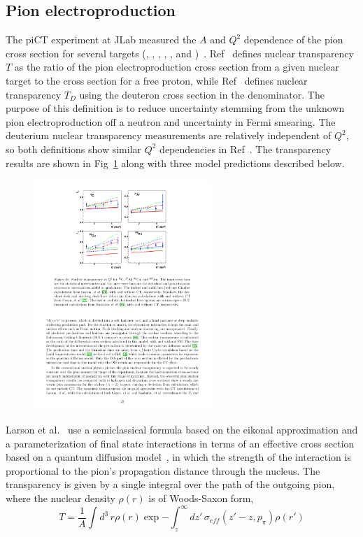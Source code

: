 \subsection{Pion electroproduction}
The piCT experiment at JLab measured the $A$ and $Q^2$ dependence of the pion
cross section for several targets (, , ,
, , and )~\cite{Clasie_2007, Qian_2010}.
Ref~\cite{Clasie_2007} defines nuclear transparency $T$ as the ratio of the pion
electroproduction cross section from a given nuclear target to the cross
section for a free proton, while Ref~\cite{Qian_2010} defines nuclear
transparency $T_D$ using the deuteron cross section in the denominator.
The purpose of this definition is to reduce uncertainty stemming from
the unknown pion electroproduction off a neutron and uncertainty in Fermi
smearing.
The deuterium nuclear transparency measurements are relatively independent of
$Q^2$, so both definitions show similar $Q^2$ dependencies in
Ref~\cite{Qian_2010}.
The transparency results are shown in
Fig~\ref{fig:pion_electroproduction_transparency_Q2_dependence} along with three
model predictions described below.

\begin{figure}[!h]
    \centering
    \includegraphics[width=0.6\textwidth]{chap2/pion_electroproduction_transparency_Q2_dependence.pdf}
    \caption{
            }
    \label{fig:pion_electroproduction_transparency_Q2_dependence}
\end{figure}

Larson et al.~\cite{Larson_2006} use a semiclassical formula based on the
eikonal approximation and a parameterization of final state interactions in
terms of an effective cross section based on a quantum diffusion
model~\cite{Farrar_1988}, in which the strength of the interaction is
proportional to the pion's propagation distance through the nucleus.
The transparency is given by a single integral over the path of the outgoing
pion, where the nuclear density $\rho(r)$ is of Woods-Saxon form,
\begin{equation}
    T = \frac{1}{A}\int d^3 \, r \rho(r)
           \exp{
                 -\int_z^\infty dz' \, \sigma_{eff} (z'-z,p_\pi) \rho(r')
               }
\end{equation}


